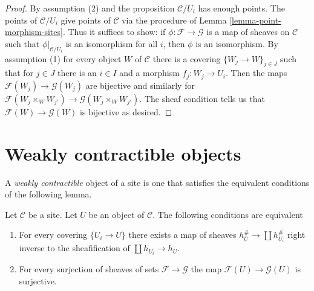 \begin{proof}
By assumption (2) and the proposition $\mathcal{C}/U_i$ has enough points.
The points of $\mathcal{C}/U_i$ give points of $\mathcal{C}$
via the procedure of Lemma \ref{lemma-point-morphism-sites}.
Thus it suffices to show: if $\phi : \mathcal{F} \to \mathcal{G}$
is a map of sheaves on $\mathcal{C}$ such that $\phi|_{\mathcal{C}/U_i}$
is an isomorphism for all $i$, then $\phi$ is an isomorphism.
By assumption (1) for every object $W$ of $\mathcal{C}$
there is a covering $\{W_j \to W\}_{j \in J}$
such that for $j \in J$ there is an $i \in I$ and a morphism
$f_j : W_j \to U_i$. Then the maps
$\mathcal{F}(W_j) \to \mathcal{G}(W_j)$
are bijective and similarly for
$\mathcal{F}(W_j \times_W W_{j'}) \to \mathcal{G}(W_j \times_W W_{j'})$.
The sheaf condition tells us that $\mathcal{F}(W) \to \mathcal{G}(W)$
is bijective as desired.
\end{proof}




\section{Weakly contractible objects}
\label{section-w-contractible}

\noindent
A {\it weakly contractible} object of a site is one that satisfies
the equivalent conditions of the following lemma.

\begin{lemma}
\label{lemma-w-contractible}
Let $\mathcal{C}$ be a site. Let $U$ be an object of $\mathcal{C}$.
The following conditions are equivalent
\begin{enumerate}
\item For every covering $\{U_i \to U\}$ there exists a map of
sheaves $h_U^\# \to \coprod h_{U_i}^\#$ right inverse to the sheafification
of $\coprod h_{U_i} \to h_U$.
\item For every surjection of sheaves of sets $\mathcal{F} \to \mathcal{G}$
the map $\mathcal{F}(U) \to \mathcal{G}(U)$ is surjective.
\end{enumerate}
\end{lemma}

